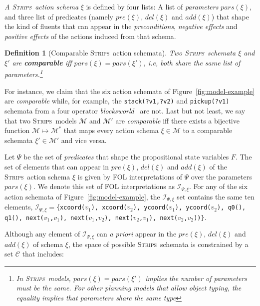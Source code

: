 \documentclass[letterpaper]{article} %
\newcommand{\strips}{\textsc{Strips}}     %
\newtheorem{definition}[theorem]{Definition}
\begin{document}
{\em A \strips\ action schema} $\xi$ is defined by four lists: A list of {\em parameters} $pars(\xi)$, and three list of predicates (namely $pre(\xi)$, $del(\xi)$ and $add(\xi)$) that shape the kind of fluents that can appear in the {\em preconditions}, {\em negative effects} and {\em positive effects} of the actions induced from that schema.

\begin{definition}[Comparable \strips\ action schemata]
Two \strips\ schemata $\xi$ and $\xi'$ are {\bf comparable} iff $pars(\xi)=pars(\xi')$, i.e, both share the same list of parameters.\footnote{In \strips\ models, $pars(\xi)=pars(\xi')$ implies the number of parameters must be the same. For other planning models that allow object typing, the equality implies that parameters share the same type}
\end{definition}

For instance, we claim that the six action schemata of Figure~\ref{fig:model-example} are {\em comparable} while, for example, the {\small\tt stack(?v1,?v2)} and {\small\tt pickup(?v1)} schemata from a four operator {\em blocksworld}~\cite{slaney2001blocks} are not. Last but not least, we say that two \strips\ models $\mathcal{M}$ and $\mathcal{M}'$ are {\em comparable} iff there exists a bijective function $\mathcal{M} \mapsto \mathcal{M}^*$ that maps every action schema $\xi\in\mathcal{M}$ to a comparable schemata $\xi'\in\mathcal{M'}$ and vice versa.

Let $\Psi$ be the set of {\em predicates} that shape the propositional state variables $F$. The set of elements that can appear in $pre(\xi)$, $del(\xi)$ and $add(\xi)$ of the \strips\ action schema $\xi$ is given by FOL interpretations of $\Psi$ over the parameters $pars(\xi)$. We denote this set of FOL interpretations as ${\mathcal I}_{\Psi,\xi}$. For any of the six action schemata of Figure~\ref{fig:model-example}, the ${\mathcal I}_{\Psi,\xi}$ set contains the same ten elements, ${\mathcal I}_{\Psi,\xi}=${\small\tt\{xcoord($v_1$), xcoord($v_2$), ycoord($v_1$), ycoord($v_2$), q0(), q1(), next($v_1$,$v_1$), next($v_1$,$v_2$), next($v_2$,$v_1$), next($v_2$,$v_2$))\}}.

Although any element of ${\mathcal I}_{\Psi,\xi}$ can {\em a priori} appear in the $pre(\xi)$, $del(\xi)$ and $add(\xi)$ of schema $\xi$, the space of possible \strips\ schemata is constrained by a set ${\mathcal C}$ that includes:
\end{document}
